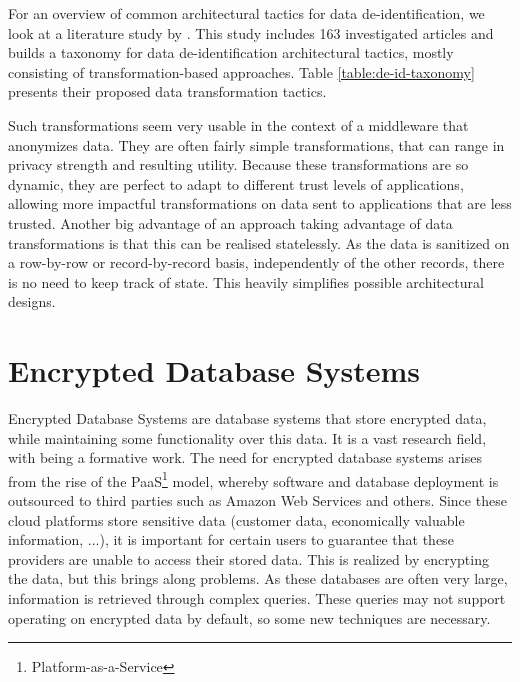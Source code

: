 For an overview of common architectural tactics for data de-identification, we look at a literature study by \citeauthor{de-id-taxonomy}. This study includes 163 investigated articles and builds a taxonomy for data de-identification architectural tactics, mostly consisting of transformation-based approaches. Table \ref{table:de-id-taxonomy} presents their proposed data transformation tactics.

Such transformations seem very usable in the context of a middleware that anonymizes data. They are often fairly simple transformations, that can range in privacy strength and resulting utility. Because these transformations are so dynamic, they are perfect to adapt to different trust levels of applications, allowing more impactful transformations on data sent to applications that are less trusted. Another big advantage of an approach taking advantage of data transformations is that this can be realised statelessly. As the data is sanitized on a row-by-row or record-by-record basis, independently of the other records, there is no need to keep track of state. This heavily simplifies possible architectural designs.
\newpage


\section{Encrypted Database Systems}
\label{sec:enc-db}
\noindent Encrypted Database Systems are database systems that store encrypted data, while maintaining some functionality over this data. It is a vast research field, with \citet{sok-cryptdb} being a formative work. The need for encrypted database systems arises from the rise of the PaaS\footnote{Platform-as-a-Service} model, whereby software and database deployment is outsourced to third parties such as Amazon Web Services and others. Since these cloud platforms store sensitive data (customer data, economically valuable information, ...), it is important for certain users to guarantee that these providers are unable to access their stored data. This is realized by encrypting the data, but this brings along problems. As these databases are often very large, information is retrieved through complex queries. These queries may not support operating on encrypted data by default, so some new techniques are necessary.

